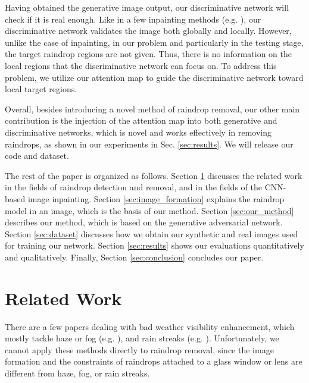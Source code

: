 \documentclass[10pt,twocolumn,letterpaper]{article}
\begin{document}
Having obtained the generative image output, our discriminative network will check if it is real enough.  Like  in a few inpainting methods (e.g. \cite{iizuka2017globally,li2017generative}), our discriminative network validates the image both globally and locally. However, unlike the case of inpainting, in our problem and particularly in the testing stage, the target raindrop regions are not given. Thus, there is no information on the local regions that the discriminative network can focus on. To address this problem, we utilize our attention map to guide the discriminative network toward local target regions. 

Overall, besides introducing a novel method of raindrop removal, our other main contribution is the injection of the attention map into both generative and discriminative networks, which is novel and works effectively in removing raindrops, as shown in our experiments in Sec. \ref{sec:results}.  We will release our code and dataset.

The rest of the paper is organized as follows. Section \ref{sec:related_work} discusses the related work in the fields of raindrop detection and removal, and in the fields of the CNN-based image inpainting.  Section \ref{sec:image_formation} explains the raindrop model in an image, which is the basis of our method. Section \ref{sec:our_method} describes our method, which is based on the generative adversarial network. Section \ref{sec:dataset} discusses how we obtain our synthetic and real images used for training our network. Section \ref{sec:results} shows our evaluations quantitatively and qualitatively. Finally, Section \ref{sec:conclusion} concludes our paper.

\section{Related Work}
\label{sec:related_work}

There are a few papers dealing with bad weather visibility enhancement, which mostly tackle haze or fog (e.g. \cite{tan2008visibility,he2011single,ren2016single}), and rain streaks (e.g. \cite{garg2007vision,fu2017clearing,li2017single,yang2017deep}). Unfortunately, we cannot apply these methods directly to raindrop removal, since the image formation and the constraints of raindrops attached to a glass window  or lens are different from haze, fog, or rain streaks. 
\end{document}
